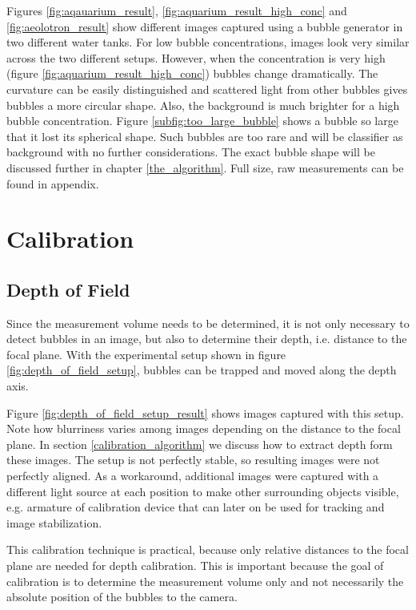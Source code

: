 			Figures \ref{fig:aqauarium_result}, \ref{fig:aquarium_result_high_conc} and \ref{fig:aeolotron_result} show different images captured using a bubble generator in two different water tanks. For low bubble concentrations, images look very similar across the two different setups. However, when the concentration is very high (figure \ref{fig:aquarium_result_high_conc}) bubbles change dramatically. The curvature can be easily distinguished and scattered light from other bubbles gives bubbles a more circular shape. Also, the background is much brighter for a high bubble concentration. Figure \ref{subfig:too_large_bubble} shows a bubble so large that it lost its spherical shape. Such bubbles are too rare and will be classifier as background with no further considerations. 
			The exact bubble shape will be discussed further in chapter \ref{the_algorithm}.	Full size, raw measurements can be found in appendix. 
	
	
	\section{Calibration}\label{calibration_setup}
		\subsection{Depth of Field}\label{sub:depth_of_field_setup}
			Since the measurement volume needs to be determined, it is not only necessary to detect bubbles in an image, but also to determine their depth, i.e. distance to the focal plane. With the experimental setup shown in figure \ref{fig:depth_of_field_setup}, bubbles can be trapped and moved along the depth axis. 
			
			Figure \ref{fig:depth_of_field_setup_result} shows images captured with this setup. Note how blurriness varies among images depending on the distance to the focal plane. In section \ref{calibration_algorithm} we discuss how to extract depth form these images. The setup is not perfectly stable, so resulting images were not perfectly aligned. As a workaround, additional images were captured with a different light source at each position to make other surrounding objects visible, e.g. armature of calibration device that can later on be used for tracking and image stabilization. 
			
			This calibration technique is practical, because only relative distances to the focal plane are needed for depth calibration. This is important because the goal of calibration is to determine the measurement volume only and not necessarily the absolute position of the bubbles to the camera. 
			
